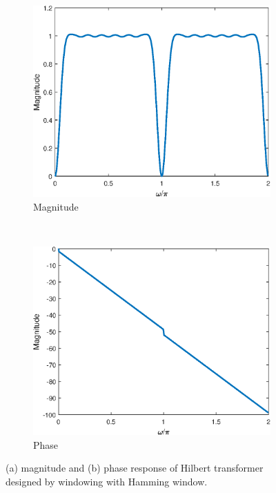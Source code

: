\documentclass{article}
\begin{document}
\FloatBarrier
\begin{figure}[h!]
	\centering
	\begin{subfigure}[h!]{0.5\textwidth}
		\includegraphics[width=\textwidth]{figs/hilbert_win_mag.eps}
		\caption{Magnitude} 
	\end{subfigure}%
	~ 
	\begin{subfigure}[h!]{0.5\textwidth}
		\includegraphics[width=\textwidth]{figs/hilbert_win_phase.eps}
		\caption{Phase}
	\end{subfigure}
	\caption{(a) magnitude and (b) phase response of Hilbert transformer designed by windowing with Hamming window.}
\end{figure}
\FloatBarrier
\end{document}
